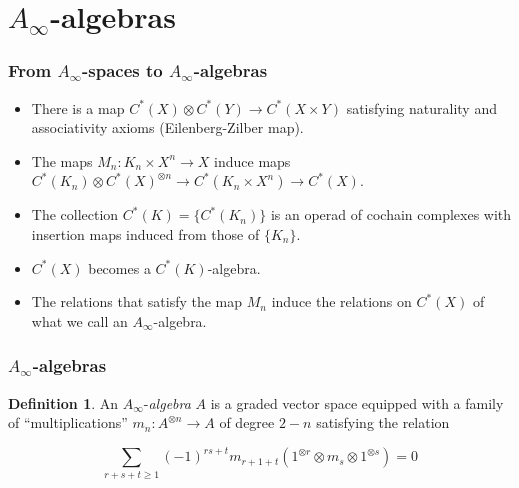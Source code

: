 \documentclass{beamer}
\theoremstyle{definition}
\newtheorem{defi}{Definition}
\begin{document}
\section{$A_\infty$-algebras}
\begin{frame}
\frametitle{From $A_\infty$-spaces to $A_\infty$-algebras}
\begin{itemize} %
\item<1-> There is a map $C^*(X)\otimes C^*(Y)\to C^*(X\times Y)$ satisfying naturality and associativity axioms (Eilenberg-Zilber map).
\item<2-> The maps $M_n:K_n\times X^n\to X$ induce maps $C^*(K_n)\otimes C^*(X)^{\otimes n}\to C^*(K_n\times  X^n)\to C^*(X)$. %
\item<3-> The collection $C^*(K)=\{C^*(K_n)\}$ is an operad of cochain complexes with insertion maps induced from those of $\{K_n\}$.
\item<4-> $C^*(X)$ becomes a $C^*(K)$-algebra.
\item<5-> The relations that satisfy the map $M_n$ induce the relations on $C^*(X)$ of what we call an $A_\infty$-algebra.
\end{itemize}
\end{frame}

%
%
\begin{frame}
\frametitle{$A_\infty$-algebras}
\begin{defi}
An $A_\infty$-\emph{algebra} $A$ is a graded vector space equipped with a family of ``multiplications'' $m_n:A^{\otimes n}\to A$ of degree $2-n$ satisfying the relation %

\[\sum_{r+s+t\geq 1}(-1)^{rs+t}m_{r+1+t}(1^{\otimes r}\otimes m_s\otimes 1^{\otimes s})=0\] %
\end{defi}
\end{frame}
\end{document}
